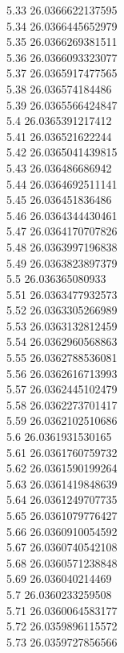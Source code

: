 {5.33	26.0366622137595\\
5.34	26.0366445652979\\
5.35	26.0366269381511\\
5.36	26.0366093323077\\
5.37	26.0365917477565\\
5.38	26.036574184486\\
5.39	26.0365566424847\\
5.4	26.0365391217412\\
5.41	26.036521622244\\
5.42	26.0365041439815\\
5.43	26.036486686942\\
5.44	26.0364692511141\\
5.45	26.036451836486\\
5.46	26.0364344430461\\
5.47	26.0364170707826\\
5.48	26.0363997196838\\
5.49	26.0363823897379\\
5.5	26.036365080933\\
5.51	26.0363477932573\\
5.52	26.0363305266989\\
5.53	26.0363132812459\\
5.54	26.0362960568863\\
5.55	26.0362788536081\\
5.56	26.0362616713993\\
5.57	26.0362445102479\\
5.58	26.0362273701417\\
5.59	26.0362102510686\\
5.6	26.0361931530165\\
5.61	26.0361760759732\\
5.62	26.0361590199264\\
5.63	26.0361419848639\\
5.64	26.0361249707735\\
5.65	26.0361079776427\\
5.66	26.0360910054592\\
5.67	26.0360740542108\\
5.68	26.0360571238848\\
5.69	26.036040214469\\
5.7	26.0360233259508\\
5.71	26.0360064583177\\
5.72	26.0359896115572\\
5.73	26.0359727856566\\
}
